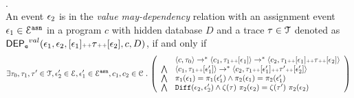 %
\\
\begin{defn}
\label{def:event_valdep}.
\\
An event $\mathtt{\epsilon}_2$ is in the \emph{value may-dependency} relation with an assignment
event $\mathtt{\epsilon}_1 \in \mathcal{E}^{\mathtt{{asn}}}$ in a program ${c}$
with hidden database $D$ and a trace $\mathtt{\tau} \in \mathcal{T}$ denoted as 
%
$\mathsf{DEP_{\mathtt{e}}}^{val}(\mathtt{\epsilon}_1, \mathtt{\epsilon}_2, [\mathtt{\epsilon}_1 ] {\scriptscriptstyle ++} \mathtt{\tau} {\scriptscriptstyle ++} [\mathtt{\epsilon}_2], c, D)$, if and only if
%
\[
\exists \vtrace_0,
\vtrace_1, \vtrace' \in \mathcal{T}, \event_2' \in \eventset, \event_1' \in \eventset^{\asn}, {c}_1, {c}_2  \in \cdom  \st
  \left(
  \begin{array}{ll}   
 & \config{{c}, \vtrace_0} \rightarrow^{*} 
\config{{c}_1, \vtrace_1 \tracecat [\event_1]}  \rightarrow^{*} 
  \config{{c}_2,  \vtrace_1 \tracecat [\event_1] \tracecat \vtrace \tracecat [\event_2] } 
 \\ 
 \bigwedge &
  \config{{c}_1, \vtrace_1 \tracecat [\event_1']}  \rightarrow^{*} 
  \config{{c}_2,  \vtrace_1 \tracecat[ \event_1'] \tracecat \vtrace' \tracecat [\event_2'] } 
\\
\bigwedge &  \pi_1(\event_1) = \pi_1(\event_1') \land \pi_2(\event_1) = \pi_2(\event_1') 
\\
\bigwedge & 
\diff(\event_2,\event_2' ) \land 
\vcounter(\vtrace) ~ \pi_2(\event_2)
= 
\vcounter(\vtrace') ~ \pi_2(\event_2)\\
\end{array}
\right)
 \]
%
\end{defn}
